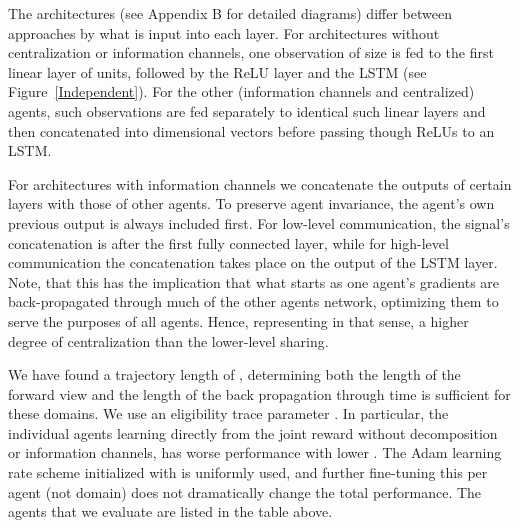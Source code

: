 \documentclass{article}
\begin{document}
\begin{SCfigure}
The architectures (see Appendix B for detailed diagrams) differ between approaches by what is input into each layer. For architectures without centralization or information channels, one observation of size  is fed to the first linear layer of  units, followed by the ReLU layer and the LSTM (see Figure~\ref{Independent}). For the other (information channels and centralized) agents,  such observations are fed separately to identical such linear layers and then concatenated into  dimensional vectors before passing though ReLUs to an LSTM. 


For architectures with information channels we concatenate the outputs of certain layers with those of other agents. To preserve agent invariance, the agent's own previous output is always included first. For low-level communication, the signal's concatenation is after the first fully connected layer, while for high-level communication the concatenation takes place on the output of the LSTM layer. Note, that this has the implication that what starts as one agent's gradients are back-propagated through much of the other agents network, optimizing them to serve the purposes of all agents. Hence, representing in that sense, a higher degree of centralization than the lower-level sharing.




We have found a trajectory length of , determining both the length of the forward view and the length of the back propagation through time is sufficient for these domains. We use an eligibility trace parameter . In particular, the individual agents learning directly from the joint reward without decomposition or information channels, has worse performance with lower . The Adam \citep{Kingma14} learning rate scheme initialized with  is uniformly used, and further fine-tuning this per agent (not domain) does not dramatically change the total performance. The agents that we evaluate are listed in the table above.












\end{SCfigure}
\end{document}
